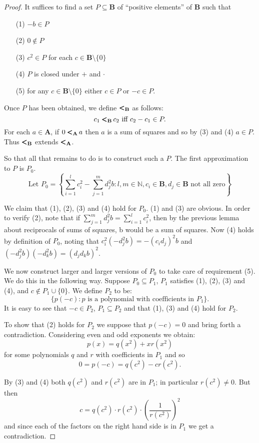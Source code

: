 \documentclass[titlepage, oneside]{amsbook}
\theoremstyle{plain}
\theoremstyle{definition}
\theoremstyle{remark}
\newcommand{\seq}{\ensuremath{\subseteq}}
\newcommand{\ba}{\ensuremath{\mathbf{A}}}
\newcommand{\bb}{\ensuremath{\mathbf{B}}}
\begin{document}
\begin{proof} It suffices to find a set $P \seq \bb$ of ``positive 
elements'' of $\bb$ such that 
\begin{itemize}
\item[(1)] $-b \in P$
\item[(2)] $0 \notin P$
\item[(3)] $c^2 \in P$ for each $c \in \bb \setminus \{ 0 \} $
\item[(4)] $P$ is closed under $+$ and $\cdot$
\item[(5)] for any $c \in \bb \setminus \{ 0 \} $ either $c \in P $ or $-c
\in P$.
\end{itemize}

Once $P$ has been obtained, we define $\pmb{<}\negthickspace_\bb$ as
follows: \[ c_1
\pmb{<}\negthickspace_\bb \,
c_2 \mbox{ iff } c_2 - c_1 \in P.\]
For each $a \in \ba$, if $0 \pmb{<}\negthickspace_\ba \,  a$ then $a$
is a
sum of squares
and
so by (3) and (4)  $a \in P$.  Thus $\pmb{<}\negthickspace_\bb$ extends
$\pmb{<}\negthickspace_\ba$.



So that all that remains to do is to construct such a $P$.
The first approximation to $P$ is $P_0$.
\[ \mbox{Let } P_0 = \left\{ \sum_{i=1}^{l} c_{i}^{2} 
- \sum_{j=1}^{m} 
d_{j}^{2}b : l,m \in \mathbb{N} , c_i \in \bb, d_j \in \bb \mbox{ not all 
zero} \right\} \]

We claim that (1), (2), (3) and (4) hold for $P_0$.
(1) and (3) are obvious. In order to verify 
(2),  note that if $\sum_{j=1}^{m} d_{j}^{2}b = \sum_{i=1}^{l}
c_{i}^{2}$, then
by 
the previous lemma about reciprocals of sums of squares, b would be a sum 
of squares.
Now (4)  holds by definition of $P_0$, noting
that $c_{i}^{2}(-d_j^2b) =
- (c_i d_j )^2b$ and \\
 $(-d_j^2b)(-d_k^2b)=(d_jd_kb)^2$.


We now  construct  larger and larger versions of $P_0$ to take care of
requirement (5).  We  do this in the following way.  Suppose $P_0 \seq
P_1$, $P_1$ satisfies (1), (2), (3) and (4), and $c \notin P_1 \cup \{ 0 \} $.  We
define $P_2$ to be: \[ \{ p ( - c) : p \mbox{ is a polynomial with
coefficients in } P_1 \}. \]
It is easy to see that $-c \in P_2$, $P_1 \seq P_2$ and that (1), (3)
and (4) hold for $P_2$.

To show that (2) holds for $P_2$ we suppose that $p(-c) = 0$ and bring
forth a contradiction.  Considering even and odd exponents we obtain:
\[ p(x) = q(x^2) + x r(x^2) \] for some polynomials $q$ and $r$ with
coefficients in $P_1$ and so \[ 0 = p (-c) = q( c^2) - c r (c^2). \]  

By (3) and (4) both $q(c^{2})$ and $r(c^{2})$ are in $P_1$; in particular $r(c^{2}) \neq 0$. But then 
\[ c = q (c^2) \cdot r ( c^2) \cdot \left( \frac{1}{r (c^2)} \right)^2 \] and since each of the factors on the right hand side is in $P_1$ we get a contradiction.

 \end{proof}
\end{document}
